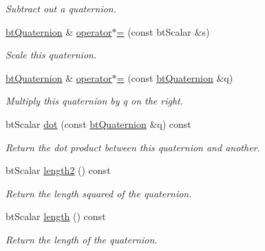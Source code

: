 \begin{DoxyCompactItemize}
\begin{DoxyCompactList}\small\item\em Subtract out a quaternion. \end{DoxyCompactList}\item 
\hyperlink{classbtQuaternion}{bt\+Quaternion} \& \hyperlink{classbtQuaternion_abd260487e98defbd77618f04d51fcc92}{operator$\ast$=} (const bt\+Scalar \&s)
\begin{DoxyCompactList}\small\item\em Scale this quaternion. \end{DoxyCompactList}\item 
\hyperlink{classbtQuaternion}{bt\+Quaternion} \& \hyperlink{classbtQuaternion_abfc6dee30a6f56e69343a31368713f95}{operator$\ast$=} (const \hyperlink{classbtQuaternion}{bt\+Quaternion} \&q)
\begin{DoxyCompactList}\small\item\em Multiply this quaternion by q on the right. \end{DoxyCompactList}\item 
bt\+Scalar \hyperlink{classbtQuaternion_a406d3d2debf9d463f2ba651b0a196d47}{dot} (const \hyperlink{classbtQuaternion}{bt\+Quaternion} \&q) const
\begin{DoxyCompactList}\small\item\em Return the dot product between this quaternion and another. \end{DoxyCompactList}\item 
\mbox{\label{classbtQuaternion_a9266520d0fcd21c667adf870a8a75256}} 
bt\+Scalar \hyperlink{classbtQuaternion_a9266520d0fcd21c667adf870a8a75256}{length2} () const
\begin{DoxyCompactList}\small\item\em Return the length squared of the quaternion. \end{DoxyCompactList}\item 
\mbox{\label{classbtQuaternion_a29bd11309609ea6734a17388a27eda75}} 
bt\+Scalar \hyperlink{classbtQuaternion_a29bd11309609ea6734a17388a27eda75}{length} () const
\begin{DoxyCompactList}\small\item\em Return the length of the quaternion. \end{DoxyCompactList}\item 
\mbox{\label{classbtQuaternion_adb5cd1eb8145a906f9f47857c498d3d6}} 

\end{DoxyCompactItemize}
